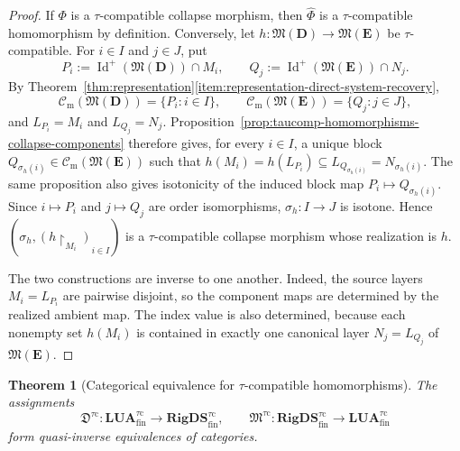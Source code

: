 \documentclass[pdflatex,sn-mathphys-num]{sn-jnl}
\theoremstyle{thmstyleone}%
\newtheorem{theorem}{Theorem}[section]
\theoremstyle{thmstyletwo}%
\theoremstyle{thmstylethree}%
\newcommand{\PosId}{\operatorname{Id}^{+}}
\newcommand{\layer}[1]{L_{#1}}
\newcommand{\Cm}{\mathcal C_{\mathrm m}}
\begin{document}
\begin{proof}
If \(\Phi\) is a \(\tau\)-compatible collapse morphism, then \(\widehat\Phi\) is a \(\tau\)-compatible homomorphism by definition.
Conversely, let \(h\colon\mathfrak M(\mathbf D)\to\mathfrak M(\mathbf E)\) be \(\tau\)-compatible.
For \(i\in I\) and \(j\in J\), put
\[
P_i:=\PosId(\mathfrak M(\mathbf D))\cap M_i,
\qquad
Q_j:=\PosId(\mathfrak M(\mathbf E))\cap N_j.
\]
By Theorem~\ref{thm:representation}\ref{item:representation-direct-system-recovery},
\[
\Cm(\mathfrak M(\mathbf D))=\{P_i:i\in I\},
\qquad
\Cm(\mathfrak M(\mathbf E))=\{Q_j:j\in J\},
\]
and \(\layer{P_i}=M_i\) and \(\layer{Q_j}=N_j\).
Proposition~\ref{prop:taucomp-homomorphisms-collapse-components} therefore gives, for every \(i\in I\), a unique block \(Q_{\sigma_h(i)}\in \Cm(\mathfrak M(\mathbf E))\) such that \(h(M_i)=h(\layer{P_i})\subseteq \layer{Q_{\sigma_h(i)}}=N_{\sigma_h(i)}. \)
The same proposition also gives isotonicity of the induced block map \(P_i\mapsto Q_{\sigma_h(i)}\).
Since \(i\mapsto P_i\) and \(j\mapsto Q_j\) are order isomorphisms, \(\sigma_h\colon I\to J\) is isotone.
Hence \((\sigma_h,(h\!\upharpoonright_{M_i})_{i\in I})\) is a \(\tau\)-compatible collapse morphism whose realization is \(h\).

The two constructions are inverse to one another.
Indeed, the source layers \(M_i=\layer{P_i}\) are pairwise disjoint, so the component maps are determined by the realized ambient map.
The index value is also determined, because each nonempty set \(h(M_i)\) is contained in exactly one canonical layer \(N_j=\layer{Q_j}\) of \(\mathfrak M(\mathbf E)\).
\end{proof}


\begin{theorem}[Categorical equivalence for \(\tau\)-compatible homomorphisms]
\label{thm:taucomp-categorical-equivalence}
The assignments
\[
\mathfrak D^{\tau\mathrm{c}}\colon
\mathbf{LUA}^{\tau\mathrm{c}}_{\mathrm{fin}}
\longrightarrow
\mathbf{RigDS}^{\tau\mathrm{c}}_{\mathrm{fin}},
\qquad
\mathfrak M^{\tau\mathrm{c}}\colon
\mathbf{RigDS}^{\tau\mathrm{c}}_{\mathrm{fin}}
\longrightarrow
\mathbf{LUA}^{\tau\mathrm{c}}_{\mathrm{fin}}
\]
form quasi-inverse equivalences of categories.
\end{theorem}
\end{document}
